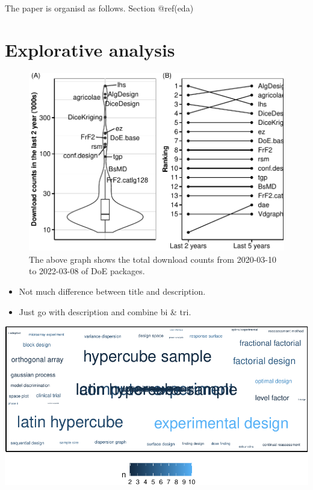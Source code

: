 The paper is organisd as follows. Section @ref(eda)

\hypertarget{eda}{%
\section{Explorative analysis}\label{eda}}

\begin{Schunk}
\begin{figure}[htbp]

{\centering \includegraphics{figures/dlplots-1} 

}

\caption[The above graph shows the total download counts from 2020-03-10 to 2022-03-08 of DoE packages]{The above graph shows the total download counts from 2020-03-10 to 2022-03-08 of DoE packages.}\label{fig:dlplots}
\end{figure}
\end{Schunk}

\begin{itemize}
\tightlist
\item
  Not much difference between title and description.
\item
  Just go with description and combine bi \& tri.
\end{itemize}

\begin{Schunk}


\begin{center}\includegraphics{figures/wordcloud-1} \end{center}

\end{Schunk}


